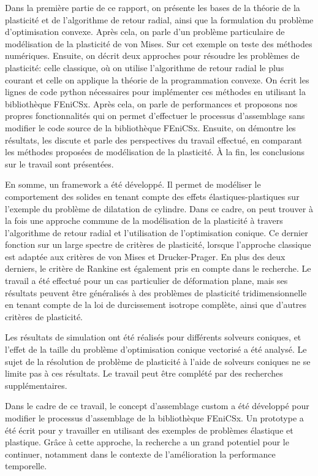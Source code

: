 \documentclass[12pt]{article}
\begin{document}
Dans la première partie de ce rapport, on présente les bases de la théorie de la plasticité et de l'algorithme de retour radial, ainsi que la formulation du problème d'optimisation convexe. Après cela, on parle d'un problème particulaire de modélisation de la plasticité de von Mises. Sur cet exemple on teste des méthodes numériques. Ensuite, on décrit deux approches pour résoudre les problèmes de plasticité: celle classique, où on utilise l'algorithme de retour radial le plus courant et celle on applique la théorie de la programmation convexe. On écrit les lignes de code python nécessaires pour implémenter ces méthodes en utilisant la bibliothèque FEniCSx. Après cela, on parle de performances et proposons nos propres fonctionnalités qui on permet d'effectuer le processus d'assemblage sans modifier le code source de la bibliothèque FEniCSx. Ensuite, on démontre les résultats, les discute et parle des perspectives du travail effectué, en comparant les méthodes proposées de modélisation de la plasticité. À la fin, les conclusions sur le travail sont présentées.

En somme, un framework a été développé. Il permet de modéliser le comportement des solides en tenant compte des effets élastiques-plastiques sur l'exemple du problème de dilatation de cylindre. Dans ce cadre, on peut trouver à la fois une approche commune de la modélisation de la plasticité à travers l'algorithme de retour radial et l'utilisation de l'optimisation conique. Ce dernier fonction sur un large spectre de critères de plasticité, lorsque l'approche classique est adaptée aux critères de von Mises et Drucker-Prager. En plus des deux derniers, le critère de Rankine est également pris en compte dans le recherche. Le travail a été effectué pour un cas particulier de déformation plane, mais ses résultats peuvent être généralisés à des problèmes de plasticité tridimensionnelle en tenant compte de la loi de durcissement isotrope complète, ainsi que d'autres critères de plasticité.

Les résultats de simulation ont été réalisés pour différents solveurs coniques, et l'effet de la taille du problème d'optimisation conique vectorisé a été analysé. Le sujet de la résolution de problème de plasticité à l'aide de solveurs coniques ne se limite pas à ces résultats. Le travail peut être complété par des recherches supplémentaires.

Dans le cadre de ce travail, le concept d'assemblage custom a été développé pour modifier le processus d'assemblage de la bibliothèque FEniCSx. Un prototype a été écrit pour y travailler en utilisant des exemples de problèmes élastique et plastique. Grâce à cette approche, la recherche a un grand potentiel pour le continuer, notamment dans le contexte de l'amélioration la performance temporelle. 
\end{document}
